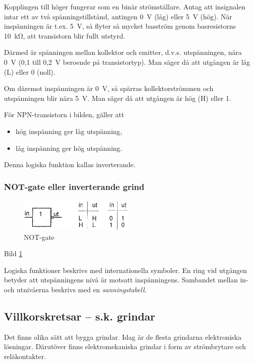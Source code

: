 Kopplingen till höger fungerar som en binär strömställare. Antag att insignalen
intar ett av två spänningstillstånd, antingen 0~V (låg) eller 5~V (hög). När
inspänningen är t.ex. 5~V, så flyter så mycket basström genom basresistorns
10~kΩ, att transistorn blir fullt utstyrd.

Därmed är spänningen mellan kollektor och emitter, d.v.s. utspänningen, nära 0~V
(0,1 till 0,2~V beroende på transistortyp). Man säger då att utgången är låg (L)
eller 0 (noll).

Om däremot inspänningen är 0~V, så spärras kollektorströmmen och utspänningen
blir nära 5~V. Man säger då att utgången är hög (H) eller 1.

För NPN-transistorn i bilden, gäller att
\begin{itemize}
\item hög inspänning ger låg utspänning,
\item låg inspänning ger hög utspänning.
\end{itemize}
Denna logiska funktion kallas inverterande.

\subsubsection{NOT-gate eller inverterande grind}

\begin{figure}
\includegraphics[width=0.5\textwidth]{images/bild_2_2-36.png}
\caption{NOT-gate}
\label{fig:BildII2-36}
\end{figure}

Bild \ref{fig:BildII2-36}

Logiska funktioner beskrivs med internationella symboler. En ring vid utgången
betyder att utspänningens nivå är motsatt inspänningens. Sambandet mellan in-
och utnivåerna beskrivs med en \emph{sanningstabell}.

\subsection{Villkorskretsar -- s.k. grindar}

Det finns olika sätt att bygga grindar. Idag är de flesta grindarna elektroniska
lösningar. Därutöver finns elektromekaniska grindar i form av strömbrytare och
reläkontakter.

